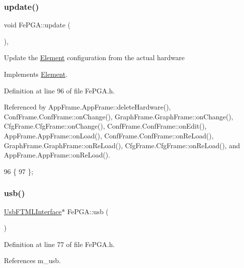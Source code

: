 \subsubsection{\texorpdfstring{update()}{update()}}
{\footnotesize\ttfamily void Fe\+P\+G\+A\+::update (\begin{DoxyParamCaption}{ }\end{DoxyParamCaption})\hspace{0.3cm}{\ttfamily [inline]}, {\ttfamily [virtual]}}

Update the \hyperlink{classElement}{Element} configuration from the actual hardware 

Implements \hyperlink{classElement_a4e6c83efae95616ebddd03c793a26661}{Element}.



Definition at line 96 of file Fe\+P\+G\+A.\+h.



Referenced by App\+Frame.\+App\+Frame\+::delete\+Hardware(), Conf\+Frame.\+Conf\+Frame\+::on\+Change(), Graph\+Frame.\+Graph\+Frame\+::on\+Change(), Cfg\+Frame.\+Cfg\+Frame\+::on\+Change(), Conf\+Frame.\+Conf\+Frame\+::on\+Edit(), App\+Frame.\+App\+Frame\+::on\+Load(), Conf\+Frame.\+Conf\+Frame\+::on\+Re\+Load(), Graph\+Frame.\+Graph\+Frame\+::on\+Re\+Load(), Cfg\+Frame.\+Cfg\+Frame\+::on\+Re\+Load(), and App\+Frame.\+App\+Frame\+::on\+Re\+Load().


\begin{DoxyCode}
96                  \{
97   \};
\end{DoxyCode}
\mbox{\label{classFePGA_a4a7889dc3c2f88f623876ca475e66410}} 
\subsubsection{\texorpdfstring{usb()}{usb()}}
{\footnotesize\ttfamily \hyperlink{classUsbFTMLInterface}{Usb\+F\+T\+M\+L\+Interface}$\ast$ Fe\+P\+G\+A\+::usb (\begin{DoxyParamCaption}{ }\end{DoxyParamCaption})\hspace{0.3cm}{\ttfamily [inline]}}



Definition at line 77 of file Fe\+P\+G\+A.\+h.



References m\+\_\+usb.



